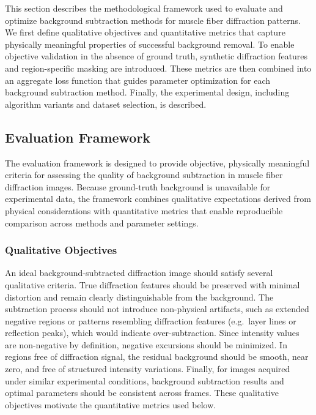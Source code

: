 \documentclass[iucr,review]{iucrjournals}
\begin{document}
This section describes the methodological framework used to evaluate and optimize background subtraction methods for muscle fiber diffraction patterns. We first define qualitative objectives and quantitative metrics that capture physically meaningful properties of successful background removal. To enable objective validation in the absence of ground truth, synthetic diffraction features and region-specific masking are introduced. These metrics are then combined into an aggregate loss function that guides parameter optimization for each background subtraction method. Finally, the experimental design, including algorithm variants and dataset selection, is described.




\subsection{Evaluation Framework}

The evaluation framework is designed to provide objective, physically meaningful criteria for assessing the quality of background subtraction in muscle fiber diffraction images. Because ground-truth background is unavailable for experimental data, the framework combines qualitative expectations derived from physical considerations with quantitative metrics that enable reproducible comparison across methods and parameter settings.

\subsubsection{Qualitative Objectives}

An ideal background-subtracted diffraction image should satisfy several qualitative criteria. True diffraction features should be preserved with minimal distortion and remain clearly distinguishable from the background. The subtraction process should not introduce non-physical artifacts, such as extended negative regions or patterns resembling diffraction features (e.g.\ layer lines or reflection peaks), which would indicate over-subtraction. Since intensity values are non-negative by definition, negative excursions should be minimized. In regions free of diffraction signal, the residual background should be smooth, near zero, and free of structured intensity variations. Finally, for images acquired under similar experimental conditions, background subtraction results and optimal parameters should be consistent across frames. These qualitative objectives motivate the quantitative metrics used below.
\end{document}
